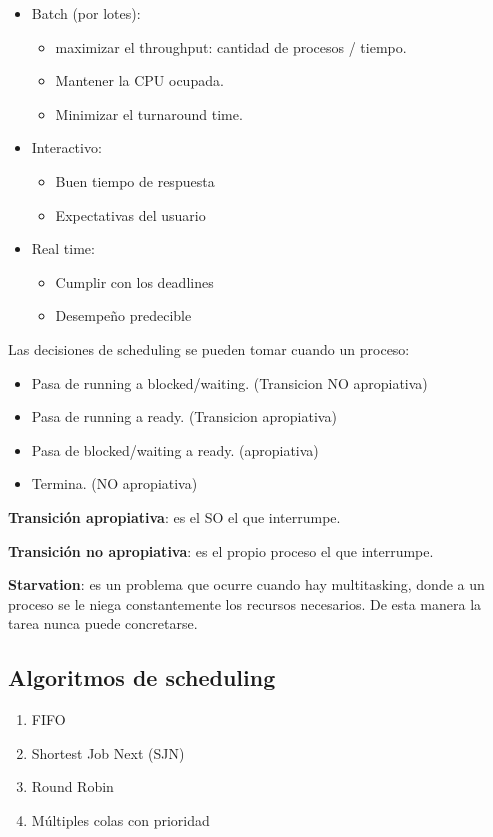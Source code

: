 \documentclass[a4paper, twoside]{article}
\begin{document}
\begin{itemize}
  \item Batch (por lotes):
  \begin{itemize}
    \item maximizar el throughput: cantidad de procesos / tiempo.
    \item Mantener la CPU ocupada.
    \item Minimizar el turnaround time.
  \end{itemize}
  \item Interactivo:
  \begin{itemize}
    \item Buen tiempo de respuesta
    \item Expectativas del usuario
  \end{itemize}
  \item Real time:
  \begin{itemize}
    \item Cumplir con los deadlines
    \item Desempeño predecible
  \end{itemize}
\end{itemize}

Las decisiones de scheduling se pueden tomar cuando un proceso:

\begin{itemize}
  \item Pasa de running a blocked/waiting. (Transicion NO apropiativa)
  \item Pasa de running a ready. (Transicion apropiativa)
  \item Pasa de blocked/waiting a ready. (apropiativa)
  \item Termina. (NO apropiativa)
\end{itemize}

\textbf{Transición apropiativa}: es el SO el que interrumpe.

\textbf{Transición no apropiativa}: es el propio proceso el que interrumpe.

\textbf{Starvation}: es un problema que ocurre cuando hay multitasking, donde
a un proceso se le niega constantemente los recursos necesarios.
De esta manera la tarea nunca puede concretarse.

\subsection{Algoritmos de scheduling}

\begin{enumerate}
  \item FIFO
  \item Shortest Job Next (SJN)
  \item Round Robin
  \item Múltiples colas con prioridad
\end{enumerate}
\end{document}
